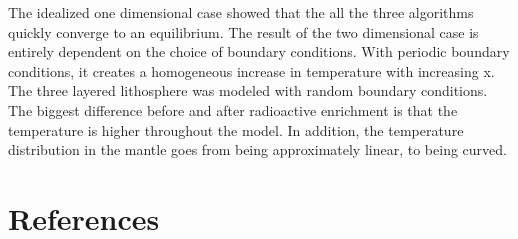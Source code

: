 \documentclass[10pt,a4paper]{article}
\begin{document}
\noindent The idealized one dimensional case showed that the all the three algorithms quickly converge to an equilibrium. The result of the two dimensional case is entirely dependent on the choice of boundary conditions. With periodic boundary conditions, it creates a homogeneous increase in temperature with increasing x. The three layered lithosphere was modeled with random boundary conditions. The biggest difference before and after radioactive enrichment is that the temperature is higher throughout the model. In addition, the temperature distribution in the mantle goes from being approximately linear, to being curved.  




\newpage
\section*{References}
\end{document}
